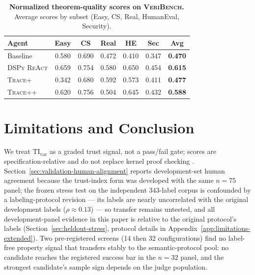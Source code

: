 \documentclass{article}
\begin{document}
\begin{table}[t]
  \centering
  \small
  \begin{tabular}{lcccccc}
    \toprule
    \textbf{Agent}      & \textbf{Easy} & \textbf{CS} & \textbf{Real} & \textbf{HE} & \textbf{Sec} & \textbf{Avg}   \\
    \midrule
    Baseline            & 0.580         & 0.690       & 0.472         & 0.410       & 0.347        & \textbf{0.470} \\
    \textsc{DSPy ReAct} & 0.659         & 0.754       & 0.580         & 0.650       & 0.454        & \textbf{0.615} \\
    \textsc{Trace+}     & 0.342         & 0.680       & 0.592         & 0.573       & 0.411        & \textbf{0.477} \\
    \textsc{Trace++}    & 0.620         & 0.756       & 0.504         & 0.645       & 0.432        & \textbf{0.588} \\
    \bottomrule
  \end{tabular}
  \caption{\textbf{Normalized theorem-quality scores on \textsc{VeriBench}.} Average scores by subset (Easy, CS, Real, HumanEval, Security).}
  \label{tab:theorem_quality_table_split}
\end{table}

\section{Limitations and Conclusion}
\label{sec:limitations-finite}
We treat \(\mathrm{TI}_{\mathrm{var}}\) as a graded trust signal, not a pass/fail gate; scores are specification-relative and do not replace kernel proof checking \citep{rice1953}.
Section~\ref{sec:validation-human-alignment} reports development-set human agreement because the trust-index form was developed with the same \(n=75\) panel; the frozen stress test on the independent \(343\)-label corpus is confounded by a labeling-protocol revision --- its labels are nearly uncorrelated with the original development labels (\(\rho \approx 0.13\)) --- so transfer remains untested, and all development-panel evidence in this paper is relative to the original protocol's labels (Section~\ref{sec:heldout-stress}, protocol details in Appendix~\ref{app:limitations-extended}).
Two pre-registered screens (14 then 32 configurations) find no label-free property signal that transfers stably to the semantic-protocol pool: no candidate reaches the registered success bar in the \(n{=}32\) panel, and the strongest candidate's sample sign depends on the judge population.
\end{document}
